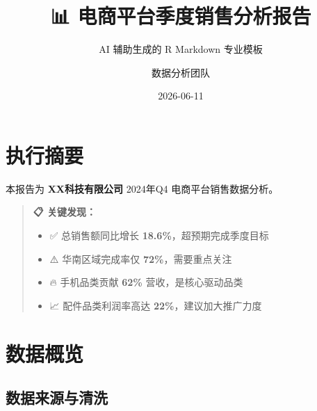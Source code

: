 \documentclass[
]{article}
\title{📊 电商平台季度销售分析报告}
\subtitle{AI 辅助生成的 R Markdown 专业模板}
\author{数据分析团队}
\date{2026-06-11}
\providecommand{\tightlist}{%
  \setlength{\itemsep}{0pt}\setlength{\parskip}{0pt}}
\begin{document}
\maketitle

{
\setcounter{tocdepth}{3}
\tableofcontents
}
\newpage

\section{执行摘要}\label{ux6267ux884cux6458ux8981}

本报告为 \textbf{XX科技有限公司} 2024年Q4 电商平台销售数据分析。

\begin{quote}
\textbf{📋 关键发现：}

\begin{itemize}
\tightlist
\item
  ✅ 总销售额同比增长 \textbf{18.6\%}，超预期完成季度目标
\item
  ⚠️ 华南区域完成率仅 \textbf{72\%}，需要重点关注
\item
  🔥 手机品类贡献 \textbf{62\%} 营收，是核心驱动品类
\item
  📈 配件品类利润率高达 \textbf{22\%}，建议加大推广力度
\end{itemize}
\end{quote}

\newpage

\section{数据概览}\label{ux6570ux636eux6982ux89c8}

\subsection{数据来源与清洗}\label{ux6570ux636eux6765ux6e90ux4e0eux6e05ux6d17}
\end{document}
